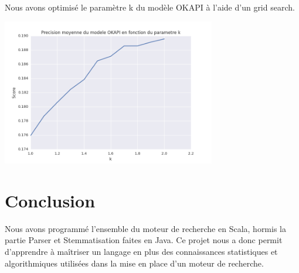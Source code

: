 \documentclass[a4paper,11pt]{report}
\begin{document}
Nous avons optimisé le paramètre k du modèle OKAPI à l'aide d'un grid search.\\
 \begin{center}
 \includegraphics[width=0.7\textwidth]{k_OKAPI}
\end{center}



















\chapter*{Conclusion}
Nous avons programmé l'ensemble du moteur de recherche en Scala, hormis la partie Parser et Stemmatisation faites en Java. Ce projet nous a donc permit d'apprendre à maîtriser un langage en plus des connaissances statistiques et algorithmiques utilisées dans la mise en place d'un moteur de recherche. 












\end{document}
